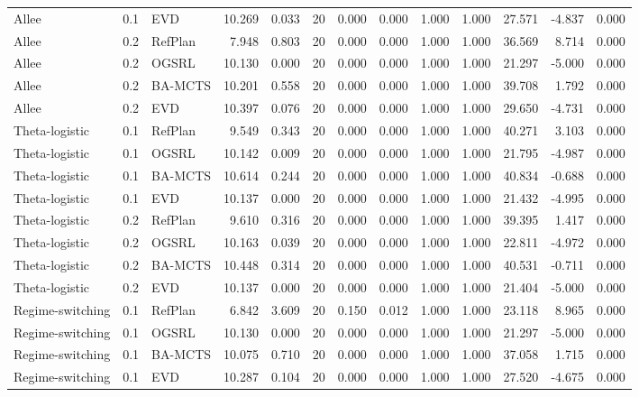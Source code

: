 \documentclass[10pt]{article}
\begin{document}
\begin{landscape}
\begin{center}
\begin{longtable}{@{}lllr@{}r@{}r@{}rrrrrrr@{}}
Allee & 0.1 & EVD & 10.269 & 0.033 & 20 & 0.000 & 0.000 & 1.000 & 1.000 & 27.571 & -4.837 & 0.000 \\
\addlinespace[1.5pt]
Allee & 0.2 & RefPlan & 7.948 & 0.803 & 20 & 0.000 & 0.000 & 1.000 & 1.000 & 36.569 & 8.714 & 0.000 \\
Allee & 0.2 & OGSRL & 10.130 & 0.000 & 20 & 0.000 & 0.000 & 1.000 & 1.000 & 21.297 & -5.000 & 0.000 \\
Allee & 0.2 & BA-MCTS & 10.201 & 0.558 & 20 & 0.000 & 0.000 & 1.000 & 1.000 & 39.708 & 1.792 & 0.000 \\
Allee & 0.2 & EVD & 10.397 & 0.076 & 20 & 0.000 & 0.000 & 1.000 & 1.000 & 29.650 & -4.731 & 0.000 \\
\addlinespace[1.5pt]
Theta-logistic & 0.1 & RefPlan & 9.549 & 0.343 & 20 & 0.000 & 0.000 & 1.000 & 1.000 & 40.271 & 3.103 & 0.000 \\
Theta-logistic & 0.1 & OGSRL & 10.142 & 0.009 & 20 & 0.000 & 0.000 & 1.000 & 1.000 & 21.795 & -4.987 & 0.000 \\
Theta-logistic & 0.1 & BA-MCTS & 10.614 & 0.244 & 20 & 0.000 & 0.000 & 1.000 & 1.000 & 40.834 & -0.688 & 0.000 \\
Theta-logistic & 0.1 & EVD & 10.137 & 0.000 & 20 & 0.000 & 0.000 & 1.000 & 1.000 & 21.432 & -4.995 & 0.000 \\
\addlinespace[1.5pt]
Theta-logistic & 0.2 & RefPlan & 9.610 & 0.316 & 20 & 0.000 & 0.000 & 1.000 & 1.000 & 39.395 & 1.417 & 0.000 \\
Theta-logistic & 0.2 & OGSRL & 10.163 & 0.039 & 20 & 0.000 & 0.000 & 1.000 & 1.000 & 22.811 & -4.972 & 0.000 \\
Theta-logistic & 0.2 & BA-MCTS & 10.448 & 0.314 & 20 & 0.000 & 0.000 & 1.000 & 1.000 & 40.531 & -0.711 & 0.000 \\
Theta-logistic & 0.2 & EVD & 10.137 & 0.000 & 20 & 0.000 & 0.000 & 1.000 & 1.000 & 21.404 & -5.000 & 0.000 \\
\addlinespace[1.5pt]
Regime-switching & 0.1 & RefPlan & 6.842 & 3.609 & 20 & 0.150 & 0.012 & 1.000 & 1.000 & 23.118 & 8.965 & 0.000 \\
Regime-switching & 0.1 & OGSRL & 10.130 & 0.000 & 20 & 0.000 & 0.000 & 1.000 & 1.000 & 21.297 & -5.000 & 0.000 \\
Regime-switching & 0.1 & BA-MCTS & 10.075 & 0.710 & 20 & 0.000 & 0.000 & 1.000 & 1.000 & 37.058 & 1.715 & 0.000 \\
Regime-switching & 0.1 & EVD & 10.287 & 0.104 & 20 & 0.000 & 0.000 & 1.000 & 1.000 & 27.520 & -4.675 & 0.000 \\

\end{longtable}
\end{center}
\end{landscape}
\end{document}
